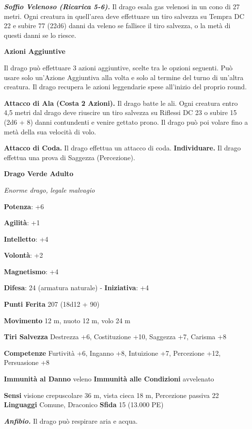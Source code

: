 \begin{multicols}{2}
\emph{\textbf{Soffio Velenoso (Ricarica 5-6).}} Il drago esala gas
velenosi in un cono di 27 metri. Ogni creatura in quell'area deve
effettuare un tiro salvezza su Tempra DC 22 e subire 77 (22d6)
danni da veleno se fallisce il tiro salvezza, o la metà di questi danni
se lo riesce.

\textbf{Azioni Aggiuntive}

Il drago può effettuare 3 azioni aggiuntive, scelte tra le opzioni
seguenti. Può usare solo un'Azione Aggiuntiva alla volta e solo al
termine del turno di un'altra creatura. Il drago recupera le azioni
leggendarie spese all'inizio del proprio round.

\textbf{Attacco di Ala (Costa 2 Azioni).} Il drago batte le ali. Ogni
creatura entro 4,5 metri dal drago deve riuscire un tiro salvezza su Riflessi DC 23 o subire 15 (2d6 + 8) danni contundenti e venire gettato
prono. Il drago può poi volare fino a metà della sua velocità di volo.

\textbf{Attacco di Coda.} Il drago effettua un attacco di coda.
\textbf{Individuare.} Il drago effettua una prova di Saggezza
(Percezione).

\textbf{Drago Verde Adulto}

\emph{Enorme drago, legale malvagio}

\textbf{Potenza}: +6

\textbf{Agilità}: +1

\textbf{Intelletto}: +4

\textbf{Volontà}: +2

\textbf{Magnetismo}: +4

\textbf{Difesa}: 24 (armatura naturale) - \textbf{Iniziativa}: +4

\textbf{Punti Ferita} 207 (18d12 + 90)

\textbf{Movimento} 12 m, nuoto 12 m, volo 24 m

\textbf{Tiri Salvezza} Destrezza +6, Costituzione +10, Saggezza +7,
Carisma +8

\textbf{Competenze} Furtività +6, Inganno +8, Intuizione +7, Percezione
+12, Persuasione +8

\textbf{Immunità al Danno} veleno \textbf{Immunità alle Condizioni}
avvelenato

\textbf{Sensi} visione crepuscolare 36 m, vista cieca 18 m, Percezione passiva
22 \textbf{Linguaggi} Comune, Draconico \textbf{Sfida} 15 (13.000 PE)\smallskip

\emph{\textbf{Anfibio.}} Il drago può respirare aria e acqua.


\end{multicols}
